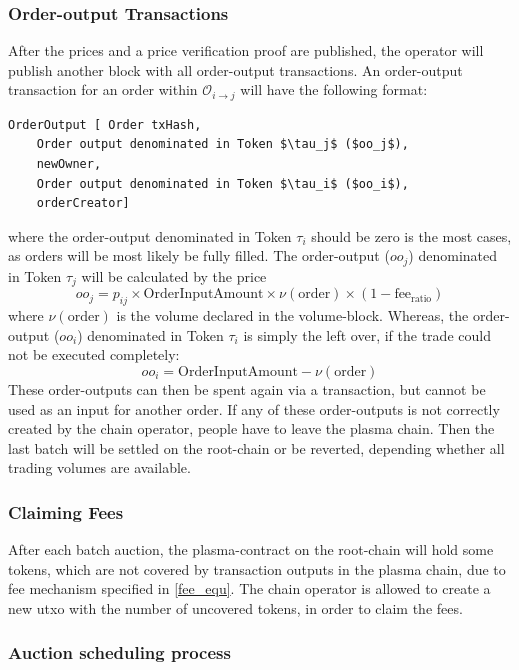 \documentclass[11pt,parskip=full]{scrartcl}%
\def\pO{\mathcal{O}}
\def\ra{\rightarrow}
\begin{document}
\subsubsection{Order-output Transactions}
After the prices and a price verification proof are published, the operator will publish another block with all order-output transactions. 
An order-output transaction for an order within $\pO_{i\ra j}$ will have the following format:

\begin{lstlisting}
OrderOutput [ Order txHash,
    Order output denominated in Token $\tau_j$ ($oo_j$), 
    newOwner,
    Order output denominated in Token $\tau_i$ ($oo_i$),
    orderCreator]

\end{lstlisting}
where the order-output denominated in Token $\tau_i$ should be zero is the most cases, as orders will be most likely be fully filled. 
The order-output ($oo_j$) denominated in Token $\tau_j$ will be calculated by the price 
\begin{equation}
  oo_j = p_{ij} \times \text{OrderInputAmount} \times \nu(\text{order}) \times (1-\text{fee}_{\text{ratio}})
    \label{fee_equ}
\end{equation}
where $\nu(\text{order})$ is the volume declared in the volume-block.  
Whereas, the order-output ($oo_i$) denominated in Token $\tau_i$ is simply the left over, if the trade could not be executed completely: 
\begin{equation}
  oo_i =  \text{OrderInputAmount} - \nu(\text{order})
\end{equation}
These order-outputs can then be spent again via a transaction, but cannot be used as an input for another order. 
If any of these order-outputs is not correctly created by the chain operator, people have to leave the plasma chain. 
Then the last batch will be settled on the root-chain or be reverted, depending whether all trading volumes are available. 

\subsubsection{Claiming Fees}
After each batch auction, the plasma-contract on the root-chain will hold some tokens, which are not covered by transaction outputs in the plasma chain, due to fee mechanism specified in \ref{fee_equ}. 
The chain operator is allowed to create a new utxo with the number of uncovered tokens, in order to claim the fees. 

\subsubsection{Auction scheduling process}
\end{document}
